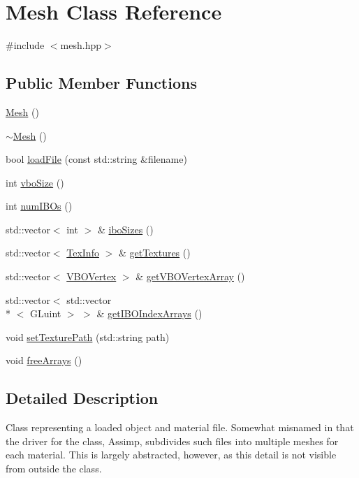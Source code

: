 \hypertarget{classMesh}{\section{Mesh Class Reference}
\label{classMesh}
}


{\ttfamily \#include $<$mesh.\-hpp$>$}

\subsection*{Public Member Functions}
\begin{DoxyCompactItemize}
\item 
\hyperlink{classMesh_a2af137f1571af89172b9c102302c416b}{Mesh} ()
\item 
\hyperlink{classMesh_a5efe4da1a4c0971cfb037bd70304c303}{$\sim$\-Mesh} ()
\item 
bool \hyperlink{classMesh_acb69ef9bf91041670f903a9e6d3f574c}{load\-File} (const std\-::string \&filename)
\item 
int \hyperlink{classMesh_a9207d439941d5d12f30d2d2ace000093}{vbo\-Size} ()
\item 
int \hyperlink{classMesh_a5334ea5e7835eae71f8fc7ba5c431818}{num\-I\-B\-Os} ()
\item 
std\-::vector$<$ int $>$ \& \hyperlink{classMesh_a2e8627844ab7ab59429dccd527fabb88}{ibo\-Sizes} ()
\item 
std\-::vector$<$ \hyperlink{structTexInfo}{Tex\-Info} $>$ \& \hyperlink{classMesh_ae37b48d6bfb51824a659cfa332297e57}{get\-Textures} ()
\item 
std\-::vector$<$ \hyperlink{structVBOVertex}{V\-B\-O\-Vertex} $>$ \& \hyperlink{classMesh_afafecb91428f264c980cc5dba0f97463}{get\-V\-B\-O\-Vertex\-Array} ()
\item 
std\-::vector$<$ std\-::vector\\*
$<$ G\-Luint $>$ $>$ \& \hyperlink{classMesh_aeef415ec50612c05dd06d2d14263558b}{get\-I\-B\-O\-Index\-Arrays} ()
\item 
void \hyperlink{classMesh_aa5fe12b38efbb4aa298b7425dc8abece}{set\-Texture\-Path} (std\-::string path)
\item 
void \hyperlink{classMesh_a7851ef56844e42b5943fe3e44c88416f}{free\-Arrays} ()
\end{DoxyCompactItemize}


\subsection{Detailed Description}
Class representing a loaded object and material file. Somewhat misnamed in that the driver for the class, Assimp, subdivides such files into multiple meshes for each material. This is largely abstracted, however, as this detail is not visible from outside the class. 

